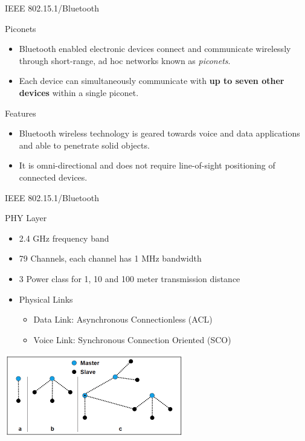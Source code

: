 \documentclass[serif,Blue]{beamer}
\begin{document}
\begin{frame}{IEEE 802.15.1/Bluetooth}
	\begin{block}{Piconets}
		\begin{itemize}\justifying{}
			\item
				Bluetooth enabled electronic devices connect and communicate
				wirelessly through short-range, ad hoc networks known as \emph{piconets}.
			\item
				Each device can simultaneously communicate with \textbf{up to seven other devices} within a
				single piconet.
		\end{itemize}
	\end{block}
	\begin{block}{Features}
		\begin{itemize}\justifying{}
			\item
				Bluetooth wireless technology is geared towards voice and data applications
				and able to penetrate solid objects.
			\item
				It is omni-directional and does not require line-of-sight positioning of connected devices.
		\end{itemize}
	\end{block}
\end{frame}

\begin{frame}{IEEE 802.15.1/Bluetooth}
	\begin{block}{PHY Layer}
		\begin{itemize}\justifying{}
			\item 2.4 GHz frequency band
			\item 79 Channels, each channel has 1 MHz bandwidth
			\item 3 Power class for 1, 10 and 100 meter transmission distance
			\item Physical Links
			\begin{itemize}
				\item Data Link: Asynchronous Connectionless (ACL)
				\item Voice Link: Synchronous Connection Oriented (SCO)
			\end{itemize}
		\end{itemize}
	\end{block}
	\center\includegraphics[scale=.7]{img/btopo.png}
\end{frame}
\end{document}
